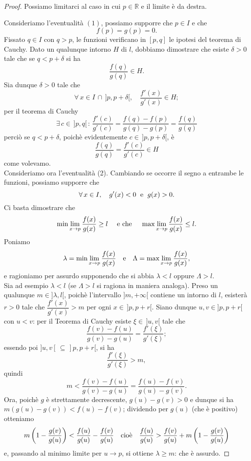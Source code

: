 \documentclass{article}
\theoremstyle{plain}
\theoremstyle{definition}
\theoremstyle{remark}
\begin{document}
\begin{proof}
    Possiamo limitarci al caso in cui $p\in\mathbb{R}$ e il limite è da destra.
    
    Consideriamo l'eventualità $(1)$, possiamo supporre che $p\in I$ e che 
    \[f(p)=g(p)=0.\]
    Fissato $q\in I$ con $q>p$, le funzioni verificano in $[p,q]$ le ipotesi del teorema di Cauchy.
    Dato un qualunque intorno $H$ di $l$, dobbiamo dimostrare che esiste $\delta>0$ tale che se $q<p+\delta$ si ha \[\dfrac{f(q)}{g(q)}\in H.\]
    Sia dunque $\delta>0$ tale che 
    \[\forall\,x\in I\,\cap\,]p,p+\delta[,\quad\dfrac{f'(x)}{g'(x)}\in H;\]
    per il teorema di Cauchy 
    \[\exists\,c\in \,]p,q[\,:\,\dfrac{f'(c)}{g'(c)}=\dfrac{f(q)-f(p)}{g(q)-g(p)}=\dfrac{f(q)}{g(q)}\]
    perciò se $q<p+\delta$, poichè evidentemente $c\in\,]p,p+\delta[$, è 
    \[\dfrac{f(q)}{g(q)}=\dfrac{f'(c)}{g'(c)}\in H\] come volevamo.\\

    Consideriamo ora l'eventualità (2). Cambiando se occorre il segno a entrambe le funzioni, possiamo supporre 
    che 
    \[\forall\,x\in I,\quad g'(x)<0\;\textup{ e }\;g(x)>0.\]
    Ci basta dimostrare che 
    \[\min\lim_{x\to p}\dfrac{f(x)}{g(x)}\geq l\quad\textup{ e che }\quad\max\lim_{x\to p}\dfrac{f(x)}{g(x)}\leq l.\]
    Poniamo 
    \[\lambda=\min\lim_{x\to p}\dfrac{f(x)}{g(x)}\quad\textup{e}\quad \Lambda=\max\lim_{x\to p}\dfrac{f(x)}{g(x)},\]
    e ragioniamo per assurdo supponendo che si abbia $\lambda<l$ oppure $\Lambda>l$.\\
    Sia ad esempio $\lambda<l$ (se $\Lambda>l$ si ragiona in maniera analoga). 
    Preso un qualunque $m\in]\lambda,l[$, poichè l'intervallo $]m,+\infty[$ contiene un intorno di $l$, esisterà $r>0$ tale che $\dfrac{f'(x)}{g'(x)}>m$ per ogni $x\in\,]p,p+r[$. 
    Siano dunque $u,v\in]p,p+r[$ con $u<v$: per il Teorema di Cauchy esiste 
    $\xi\in\,]u,v[$ tale che \[\dfrac{f(v)-f(u)}{g(v)-g(u)}=\dfrac{f'(\xi)}{g'(\xi)};\] essendo poi $]u,v[\,\subseteq\,]p,p+r[$, si ha 
    \[\dfrac{f'(\xi)}{g'(\xi)}>m,\] quindi \[m<\dfrac{f(v)-f(u)}{g(v)-g(u)}=\dfrac{f(u)-f(v)}{g(u)-g(v)}.\]
    Ora, poichè $g$ è strettamente decrescente, $g(u)-g(v)>0$ e dunque si ha $m(g(u)-g(v))<f(u)-f(v)$; dividendo per $g(u)$ (che è positivo) otteniamo 
    \[m\left(1-\dfrac{g(v)}{g(u)}\right)<\dfrac{f(u)}{g(u)}-\dfrac{f(v)}{g(u)}\quad\textup{cioè}\quad\dfrac{f(u)}{g(u)}>\dfrac{f(v)}{g(u)}+m\left(1-\dfrac{g(v)}{g(u)}\right)\]
    e, passando al minimo limite per $u\to p$, si ottiene $\lambda\geq m$: che è assurdo.
\end{proof}
\end{document}
